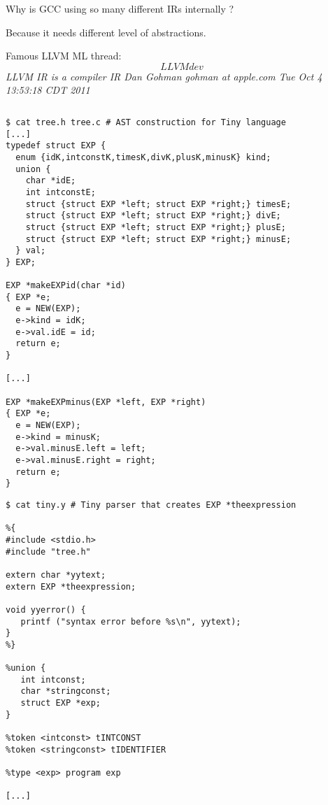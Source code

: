 \begin{slide*}
    Why is GCC using so many different IRs internally ?

    Because it needs different level of abstractions.

    Famous LLVM ML thread:
    \emph{
    \[LLVMdev\] LLVM IR is a compiler IR
    Dan Gohman gohman at apple.com
    Tue Oct 4 13:53:18 CDT 2011}

    \begin{verbatim}
    \end{verbatim}

\end{slide*}

\begin{slide*}
\begin{scriptsize}
\begin{verbatim}
$ cat tree.h tree.c # AST construction for Tiny language
[...]
typedef struct EXP {
  enum {idK,intconstK,timesK,divK,plusK,minusK} kind;
  union {
    char *idE;
    int intconstE;
    struct {struct EXP *left; struct EXP *right;} timesE;
    struct {struct EXP *left; struct EXP *right;} divE;
    struct {struct EXP *left; struct EXP *right;} plusE;
    struct {struct EXP *left; struct EXP *right;} minusE;
  } val;  
} EXP;

EXP *makeEXPid(char *id)
{ EXP *e;
  e = NEW(EXP);
  e->kind = idK;
  e->val.idE = id;
  return e;
}

[...]

EXP *makeEXPminus(EXP *left, EXP *right)
{ EXP *e;  
  e = NEW(EXP);
  e->kind = minusK;
  e->val.minusE.left = left;
  e->val.minusE.right = right;
  return e;
}
\end{verbatim}
\end{scriptsize}
\vfil
\end{slide*}
 
\begin{slide*}
\begin{scriptsize}
\begin{verbatim}
$ cat tiny.y # Tiny parser that creates EXP *theexpression

%{
#include <stdio.h>
#include "tree.h"

extern char *yytext;
extern EXP *theexpression;

void yyerror() {
   printf ("syntax error before %s\n", yytext);
}
%}

%union {
   int intconst;
   char *stringconst;
   struct EXP *exp;
}

%token <intconst> tINTCONST
%token <stringconst> tIDENTIFIER 

%type <exp> program exp

[...]
\end{verbatim}
\end{scriptsize}
\vfil
\end{slide*}
 
